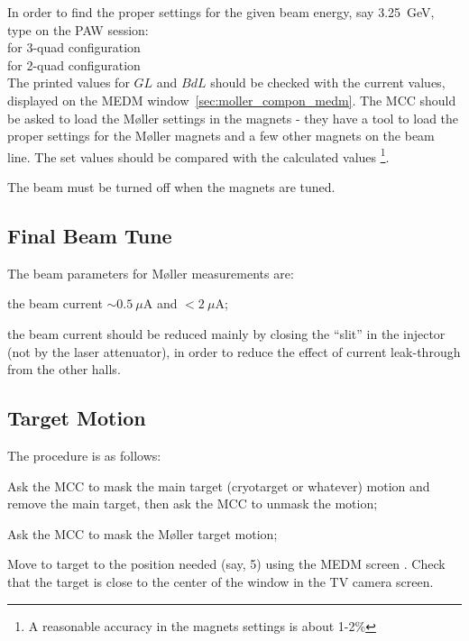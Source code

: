 { In order to find the proper settings for the given beam energy, say 3.25~GeV, 
 type on the PAW session: \\ 
 \hspace*{0.5cm}  for 3-quad configuration \\
 \hspace*{0.5cm}  for 2-quad configuration \\
 The printed values for $GL$ and $BdL$ should be checked with the current values,
 displayed on the MEDM window~\ref{sec:moller_compon_medm}. 
 The MCC should be asked to load the M{\o}ller settings in the magnets -
 they have a tool to load the proper settings for the M{\o}ller
 magnets and a few other magnets on the beam line. 
 The set values should be compared with the calculated values%
 \footnote{A reasonable accuracy in the  magnets settings is about 1-2\%}.
 \begin{safetyen}{5}{2}
   The beam must be turned off when the magnets are tuned.
 \end{safetyen}


\subsection {Final Beam Tune}
\label{sec:moller_oper_finalbeam}

 The beam parameters for M{\o}ller measurements
 are: 
   \begin{list}{--}{\setlength{\itemsep}{-0.15cm}}        
     \item \begin{safetyen}{5}{0} the beam current $\sim{}0.5~\mu$A and $<2~\mu$A;
            \end{safetyen}
     \item the beam current should be reduced mainly by closing the ``slit''
           in the injector (not by the laser attenuator), in order to
           reduce the effect of current leak-through from the other halls.
   \end{list}


\subsection {Target Motion}
\label{sec:moller_oper_target}
 The procedure is as follows:
   \begin{list}{--}{\setlength{\itemsep}{-0.15cm}}        
     \item Ask the MCC to mask the main target (cryotarget or whatever) motion
           and remove the main target, then ask the MCC to unmask the motion;
     \item Ask the MCC to mask the M{\o}ller target motion;
     \item Move to target to the position needed (say, 5) using
           the MEDM screen .
           Check that the target is close to the center of the window
           in the TV camera screen. 
   \end{list}

}
